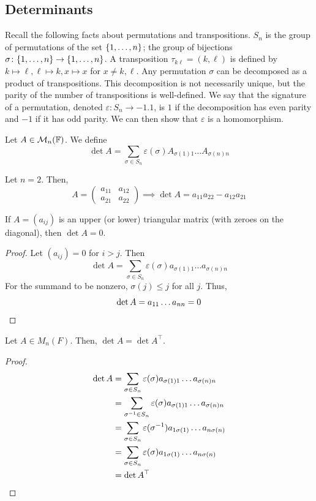 \documentclass[a4paper,11pt]{article}
\begin{document}
\subsection{Determinants}
Recall the following facts about permutations and transpositions.
$ S_n $ is the group of permutations of the set $ \qty{1, \dots, n} $; the group of bijections $ \sigma \colon \qty{1, \dots, n} \to \qty{1, \dots, n} $.
A transposition $ \tau_{k \ell} = (k, \ell) $ is defined by $ k \mapsto \ell, \ell \mapsto k, x \mapsto x $ for $ x \neq k, \ell $.
Any permutation $ \sigma $ can be decomposed as a product of transpositions.
This decomposition is not necessarily unique, but the parity of the number of transpositions is well-defined.
We say that the signature of a permutation, denoted $ \varepsilon \colon S_n \to \qty{-1, 1} $, is $ 1 $ if the decomposition has even parity and $ -1 $ if it has odd parity.
We can then show that $ \varepsilon $ is a homomorphism.

\begin{definition}
	Let $ A \in {\mathcal{M}}_n({\mathbb{F}}) $.
	We define
	\[
		\det A = \sum_{\sigma \in S_n} \varepsilon(\sigma) A_{\sigma(1) 1} \dots A_{\sigma(n) n}
	\]
\end{definition}

\begin{example}
	Let $ n = 2 $.
	Then,
	\[
		A = \begin{pmatrix} a_{11} & a_{12} \\ a_{21} & a_{22} \end{pmatrix} \implies \det A = a_{11} a_{22} - a_{12} a_{21}
	\]
\end{example}
\begin{lemma}
	If $ A = (a_{ij}) $ is an upper (or lower) triangular matrix (with zeroes on the diagonal), then $ \det A = 0 $.
\end{lemma}
\begin{proof}
	Let $ (a_{ij}) = 0 $ for $ i > j $.
	Then
	\[
		\det A = \sum_{\sigma \in S_n} \varepsilon(\sigma) a_{\sigma(1) 1} \dots a_{\sigma(n) n}
	\]
	For the summand to be nonzero, $ \sigma(j) \leq j $ for all $ j $.
	Thus,
	\[
		\det A = a_{1 1} \dots a_{n n} = 0\qedhere
	\]
\end{proof}

\begin{lemma}
	Let $ A \in M_n(F) $.
	Then, $ \det A = \det A^\top $.
\end{lemma}
\begin{proof}
	\begin{align*}
		\det A & = \sum_{\sigma \in S_n} \varepsilon(\sigma) a_{\sigma(1) 1} \dots a_{\sigma(n) n}      \\
		       & = \sum_{\sigma^{-1} \in S_n} \varepsilon(\sigma) a_{\sigma(1) 1} \dots a_{\sigma(n) n} \\
		       & = \sum_{\sigma \in S_n} \varepsilon(\sigma^{-1}) a_{1 \sigma(1)} \dots a_{n \sigma(n)} \\
		       & = \sum_{\sigma \in S_n} \varepsilon(\sigma) a_{1 \sigma(1)} \dots a_{n \sigma(n)}      \\
		       & = \det A^\top\qedhere
	\end{align*}
\end{proof}
\end{document}
